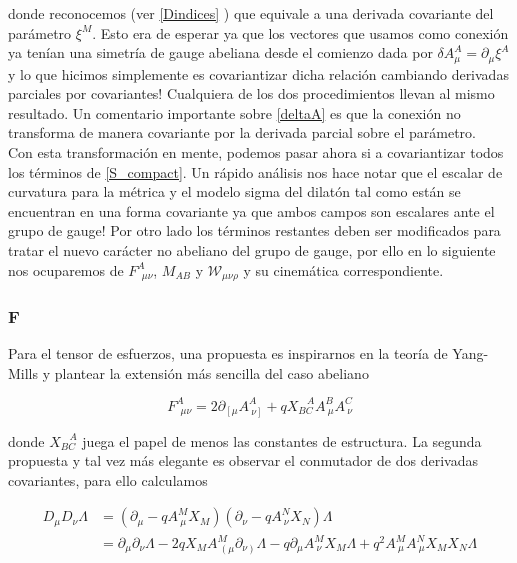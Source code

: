 \documentclass{article}
\numberwithin{equation}{section}
\begin{document}
donde reconocemos (ver \ref{Dindices} ) que equivale a una derivada covariante del parámetro $ \xi^M $. Esto era de esperar ya que los vectores que usamos como conexión ya tenían una simetría de gauge abeliana desde el comienzo dada por $ \delta A^A_{\mu} = \partial_{\mu} \xi^A $ y lo que hicimos simplemente es covariantizar dicha relación cambiando derivadas parciales por covariantes! Cualquiera de los dos procedimientos llevan al mismo resultado. Un comentario importante sobre \ref{deltaA} es que la conexión no transforma de manera covariante por la derivada parcial sobre el parámetro.\\



Con esta transformación en mente, podemos pasar ahora si a covariantizar todos los términos de \ref{S_compact}. Un rápido análisis nos hace notar que el escalar de curvatura para la métrica y el modelo sigma del dilatón tal como están se encuentran en una forma covariante ya que ambos campos son escalares ante el grupo de gauge! Por otro lado los términos restantes deben ser modificados para tratar el nuevo carácter no abeliano del grupo de gauge, por ello en lo siguiente nos ocuparemos de $ F^A_{\ \ \mu \nu} $, $ M_{A B} $ y $ \mathcal{W}_{\mu \nu \rho} $ y su cinemática correspondiente.

\subsubsection{F}

Para el tensor de esfuerzos, una propuesta es inspirarnos en la teoría de Yang-Mills y plantear la extensión más sencilla del caso abeliano

\begin{boxquation}
	\begin{equation}\label{Fgauged}
	F^A_{\ \ \mu \nu} = 2 \partial_{\left[ \mu\right.} A^A_{\ \left. \nu \right]} + q X_{B C}^{\ \ \ \ A} A^B_{\ \mu} A^C_{\ \nu} 
	\end{equation}
\end{boxquation}


donde $ X_{B C}^{\ \ \ \ A} $ juega el papel de menos las constantes de estructura. La segunda propuesta y tal vez más elegante es observar el conmutador de dos derivadas covariantes, para ello calculamos

\begin{equation}\label{DmuDnu}
\begin{aligned}
D_{\mu}D_{\nu} \Lambda &= \left( \partial_{\mu} - q A^M_{\ \mu} X_M\right) \left( \partial_{\nu} - q A^N_{\ \nu} X_N\right) \Lambda\\
&= \partial_{\mu} \partial_{\nu} \Lambda - 2q X_M A^M_{\ \left( \mu \right.} \partial_{\left. \nu\right)} \Lambda - q \partial_{\mu} A^M_{\ \nu} X_M \Lambda + q^2 A^M_{\ \mu} A^N_{\ \mu} X_M X_N \Lambda\\
\end{aligned}
\end{equation}
\end{document}
